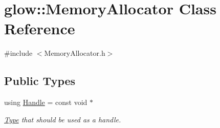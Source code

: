 \hypertarget{classglow_1_1_memory_allocator}{}\section{glow\+:\+:Memory\+Allocator Class Reference}
\label{classglow_1_1_memory_allocator}


{\ttfamily \#include $<$Memory\+Allocator.\+h$>$}

\subsection*{Public Types}
\begin{DoxyCompactItemize}
\item 
\mbox{\label{classglow_1_1_memory_allocator_a8ebc21e1c9250f73f2e85aca3ae4ae9d}} 
using \hyperlink{classglow_1_1_memory_allocator_a8ebc21e1c9250f73f2e85aca3ae4ae9d}{Handle} = const void $\ast$
\begin{DoxyCompactList}\small\item\em \hyperlink{structglow_1_1_type}{Type} that should be used as a handle. \end{DoxyCompactList}\end{DoxyCompactItemize}
